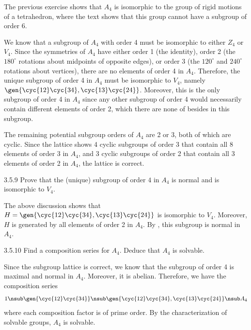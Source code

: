 \begin{sol}
    The previous exercise shows that $A_4$ is isomorphic to the group of rigid motions of a tetrahedron, where the text shows that this group cannot have a subgroup of order 6.

    We know that a subgroup of $A_4$ with order 4 must be isomorphic to either $Z_4$ or $V_4$.
	Since the symmetries of $A_4$ have either order 1 (the identity), order 2 (the $180^\circ$ rotations about midpoints of opposite edges), or order 3 (the $120^\circ$ and $240^\circ$ rotations about vertices), there are no elements of order 4 in $A_4$.
	Therefore, the unique subgroup of order 4 in $A_4$ must be isomorphic to $V_4$, namely $\gen{\cyc{1 2}\cyc{3 4}, \cyc{1 3}\cyc{2 4}}$.
	Moreover, this is the only subgroup of order 4 in $A_4$ since any other subgroup of order 4 would necessarily contain different elements of order 2, which there are none of besides in this subgroup.

    The remaining potential subgroup orders of $A_4$ are 2 or 3, both of which are cyclic.
	Since the lattice shows 4 cyclic subgroups of order 3 that contain all 8 elements of order 3 in $A_4$, and 3 cyclic subgroups of order 2 that contain all 3 elements of order 2 in $A_4$, the lattice is correct.
\end{sol}

\begin{exercise}{3.5.9}
    Prove that the (unique) subgroup of order $4$ in $A_4$ is normal and is isomorphic to $V_4$.
\end{exercise}

\begin{sol}
    The above discussion shows that $H = \gen{\cyc{1 2}\cyc{3 4}, \cyc{1 3}\cyc{2 4}}$ is isomorphic to $V_4$.
	Moreover, $H$ is generated by all elements of order 2 in $A_4$.
	By , this subgroup is normal in $A_4$.
\end{sol}

\begin{exercise}{3.5.10}
    Find a composition series for $A_4$.
	Deduce that $A_4$ is solvable.
\end{exercise}

\begin{sol}
    Since the subgroup lattice is correct, we know that the subgroup of order 4 is maximal and normal in $A_4$.
	Moreover, it is abelian.
	Therefore, we have the composition series
    \[
    	1 \nsub \gen{\cyc{1 2}\cyc{3 4}} \nsub \gen{\cyc{1 2}\cyc{3 4}, \cyc{1 3}\cyc{2 4}} \nsub A_4
    \]
    where each composition factor is of prime order.
	By the characterization of solvable groups, $A_4$ is solvable.
\end{sol}

